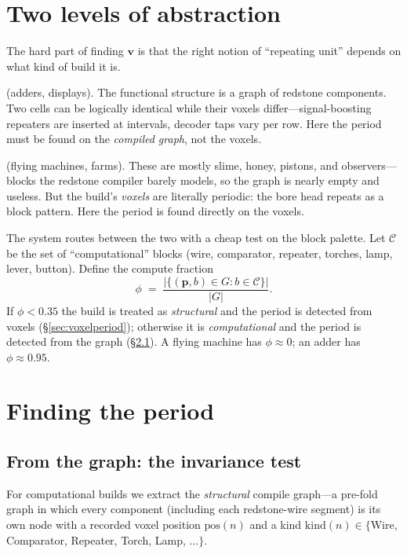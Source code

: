 \documentclass[11pt]{article}
\newcommand{\vv}{\mathbf{v}}
\newcommand{\pp}{\mathbf{p}}
\begin{document}
\section{Two levels of abstraction}\label{sec:levels}

The hard part of finding $\vv$ is that the right notion of ``repeating unit''
depends on what kind of build it is.

\begin{description}[leftmargin=1.4em]
\item[Computational redstone] (adders, displays). The functional structure is a
graph of redstone components. Two cells can be logically identical while their
voxels differ---signal-boosting repeaters are inserted at intervals, decoder
taps vary per row. Here the period must be found on the \emph{compiled graph},
not the voxels.

\item[Structural / mechanical] (flying machines, farms). These are mostly slime,
honey, pistons, and observers---blocks the redstone compiler barely models, so
the graph is nearly empty and useless. But the build's \emph{voxels} are
literally periodic: the bore head repeats as a block pattern. Here the period is
found directly on the voxels.
\end{description}

The system routes between the two with a cheap test on the block palette. Let
$\mathcal{C}$ be the set of ``computational'' blocks (wire, comparator, repeater,
torches, lamp, lever, button). Define the compute fraction
\[
\phi \;=\; \frac{\bigl|\{(\pp,b)\in G : b \in \mathcal{C}\}\bigr|}{|G|}.
\]
If $\phi < 0.35$ the build is treated as \emph{structural} and the period is
detected from voxels (\S\ref{sec:voxelperiod}); otherwise it is
\emph{computational} and the period is detected from the graph
(\S\ref{sec:graphperiod}). A flying machine has $\phi\approx0$; an adder has
$\phi\approx0.95$.

\section{Finding the period}

\subsection{From the graph: the invariance test}\label{sec:graphperiod}

For computational builds we extract the \emph{structural} compile graph---a
pre-fold graph in which every component (including each redstone-wire segment) is
its own node with a recorded voxel position $\mathrm{pos}(n)$ and a kind
$\mathrm{kind}(n)\in\{$Wire, Comparator, Repeater, Torch, Lamp, $\dots\}$.
\end{document}

